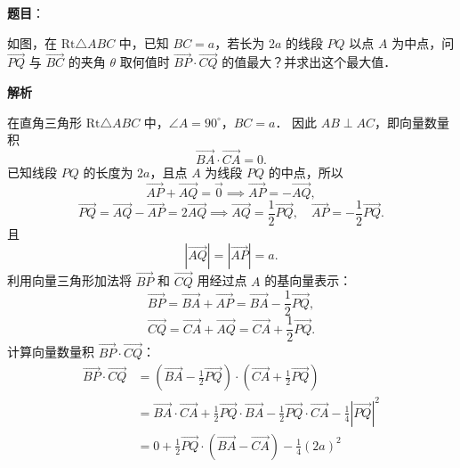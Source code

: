 \begin{answer}

\textbf{题目}：

如图，在 $\mathrm{Rt}\triangle ABC$ 中，已知 $BC = a$，若长为 $2a$ 的线段 $PQ$ 以点 $A$ 为中点，问 $\vec{PQ}$ 与 $\vec{BC}$ 的夹角 $\theta$ 取何值时 $\vec{BP} \cdot \vec{CQ}$ 的值最大？并求出这个最大值．
\nopagebreak[4]
\begin{center}\end{center}
\nopagebreak[4]
\textbf{解析}
\nopagebreak[4]
\begin{center}\end{center}
\nopagebreak[4]
在直角三角形 $\mathrm{Rt}\triangle ABC$ 中，$\angle A = 90^\circ$，$BC = a$．
因此 $AB \perp AC$，即向量数量积
\nopagebreak[4]
\[
\overrightarrow{BA} \cdot \overrightarrow{CA} = 0.
\]
已知线段 $PQ$ 的长度为 $2a$，且点 $A$ 为线段 $PQ$ 的中点，所以
\nopagebreak[4]
\[
\overrightarrow{AP} + \overrightarrow{AQ} = \vec{0} \implies \overrightarrow{AP} = -\overrightarrow{AQ},
\]
\nopagebreak[4]
\[
\overrightarrow{PQ} = \overrightarrow{AQ} - \overrightarrow{AP} = 2\overrightarrow{AQ} \implies \overrightarrow{AQ} = \frac{1}{2}\overrightarrow{PQ}, \quad \overrightarrow{AP} = -\frac{1}{2}\overrightarrow{PQ}.
\]
且
\nopagebreak[4]
\[
|\overrightarrow{AQ}| = |\overrightarrow{AP}| = a.
\]
利用向量三角形加法将 $\overrightarrow{BP}$ 和 $\overrightarrow{CQ}$ 用经过点 $A$ 的基向量表示：
\nopagebreak[4]
\[
\overrightarrow{BP} = \overrightarrow{BA} + \overrightarrow{AP} = \overrightarrow{BA} - \frac{1}{2}\overrightarrow{PQ},
\]
\nopagebreak[4]
\[
\overrightarrow{CQ} = \overrightarrow{CA} + \overrightarrow{AQ} = \overrightarrow{CA} + \frac{1}{2}\overrightarrow{PQ}.
\]
计算向量数量积 $\overrightarrow{BP} \cdot \overrightarrow{CQ}$：
\nopagebreak[4]
\[
\begin{aligned}
\overrightarrow{BP} \cdot \overrightarrow{CQ} &= \left(\overrightarrow{BA} - \frac{1}{2}\overrightarrow{PQ}\right) \cdot \left(\overrightarrow{CA} + \frac{1}{2}\overrightarrow{PQ}\right) \\
&= \overrightarrow{BA} \cdot \overrightarrow{CA} + \frac{1}{2}\overrightarrow{PQ} \cdot \overrightarrow{BA} - \frac{1}{2}\overrightarrow{PQ} \cdot \overrightarrow{CA} - \frac{1}{4}|\overrightarrow{PQ}|^2 \\
&= 0 + \frac{1}{2}\overrightarrow{PQ} \cdot (\overrightarrow{BA} - \overrightarrow{CA}) - \frac{1}{4}(2a)^2 \\

\end{aligned}\]
\end{answer}
